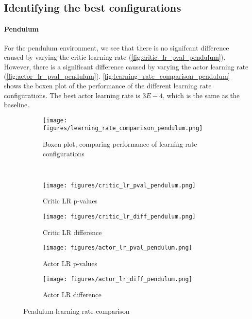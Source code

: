 \documentclass{article}
\begin{document}
\subsection{Identifying the best configurations}

\paragraph{Pendulum}
For the pendulum environment, we see that there is no signifcant difference caused by varying the critic learning rate (\autoref{fig:critic_lr_pval_pendulum}). However, there is a significant difference caused by varying the actor learning rate (\autoref{fig:actor_lr_pval_pendulum}). \autoref{fig:learning_rate_comparison_pendulum} shows the boxen plot of the performance of the different learning rate configurations. The best actor learning rate is \(3E-4\), which is the same as the baseline.

\begin{figure}[htbp]
    \centering
    \begin{subfigure}{0.4\textwidth}
        \centering
        \texttt{[image: figures/learning\_rate\_comparison\_pendulum.png]}
        \captionsetup{justification=centering}
        \caption{Boxen plot, comparing performance of learning rate configurations}
        \label{fig:learning_rate_comparison_pendulum}
    \end{subfigure}
    \\
    \begin{subfigure}{0.24\textwidth}
        \centering
        \texttt{[image: figures/critic\_lr\_pval\_pendulum.png]}
        \captionsetup{justification=centering}
        \caption{Critic LR p-values}
        \label{fig:critic_lr_pval_pendulum}
    \end{subfigure}
    \begin{subfigure}{0.24\textwidth}
        \centering
        \texttt{[image: figures/critic\_lr\_diff\_pendulum.png]}
        \captionsetup{justification=centering}
        \caption{Critic LR difference}
        \label{fig:critic_lr_diff_pendulum}
    \end{subfigure}
    \begin{subfigure}{0.24\textwidth}
        \centering
        \texttt{[image: figures/actor\_lr\_pval\_pendulum.png]}
        \captionsetup{justification=centering}
        \caption{Actor LR p-values}
        \label{fig:actor_lr_pval_pendulum}
    \end{subfigure}
    \begin{subfigure}{0.24\textwidth}
        \centering
        \texttt{[image: figures/actor\_lr\_diff\_pendulum.png]}
        \captionsetup{justification=centering}
        \caption{Actor LR difference}
        \label{fig:actor_lr_diff_pendulum}
    \end{subfigure}
    \caption{Pendulum learning rate comparison}
    \label{fig:pendulum_analysis}
\end{figure}
\end{document}
